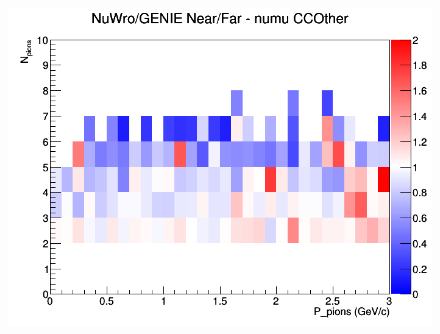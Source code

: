 \documentclass[12pt]{article}
\begin{document}
\begin{figure}[h]
\endminipage
{}
\includegraphics[width=\linewidth]{N_P/nominal/pions/ratios/CCOther_NuWro_GENIE_numu_NF_N_P.png}
\endminipage
\newline
\end{figure}
\clearpage
\end{document}
